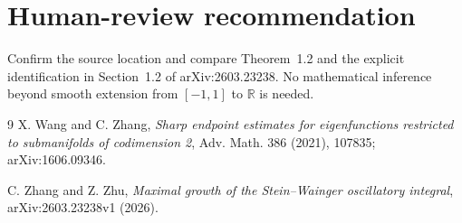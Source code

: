 \documentclass[11pt]{article}
\begin{document}
\section*{Human-review recommendation}
Confirm the source location and compare Theorem~1.2 and the explicit
identification in Section~1.2 of arXiv:2603.23238.  No mathematical inference
beyond smooth extension from $[-1,1]$ to $\mathbb R$ is needed.

\begin{thebibliography}{9}
X. Wang and C. Zhang,
\emph{Sharp endpoint estimates for eigenfunctions restricted to submanifolds
of codimension 2}, Adv. Math. 386 (2021), 107835;
arXiv:1606.09346.

C. Zhang and Z. Zhu,
\emph{Maximal growth of the Stein--Wainger oscillatory integral},
arXiv:2603.23238v1 (2026).
\end{thebibliography}
\end{document}
